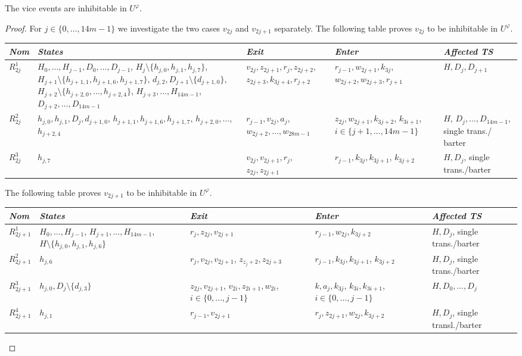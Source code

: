 \documentclass[english]{lipics_hacked}
\begin{document}
\begin{lemma}
\label{lemma:vice}
The vice events are inhibitable in $U^\varphi$.
\end{lemma}
%
\begin{proof}
For $j\in \{0,\dots, 14m-1\}$ we investigate the two cases $v_{2j}$ and $v_{2j+1}$ separately.
The following table proves $v_{2j}$ to be inhibitable in $U^\varphi$.
%
\begin{longtable}{p{0.5cm} p{3.9cm}   p{2.5cm}    p{2.7cm}      p{2cm}  }
\textit{Nom} &\textit{States} & \textit{Exit} & \textit{Enter} & \textit{Affected TS}  \\ \hline
$R_{2j}^1$ & $H_0,\dots,H_{j-1}, D_0,\dots,D_{j-1}$, $H_j\setminus\{h_{j,0},h_{j,1},h_{j,7}\}$, \newline$H_{j+1}\setminus\{h_{j+1,1},h_{j+1,6},h_{j+1,7}\}$, $d_{j,2}, D_{j+1}\setminus\{d_{j+1,0}\}$, $H_{j+2}\setminus\{h_{j+2,0},\ldots, h_{j+2,4}\}$, $H_{j+3},\dots,H_{14m-1}$, $D_{j+2},\dots,D_{14m-1}$ & $v_{2j},z_{2j+1},r_j,z_{2j+2}$, $z_{2j+3},k_{3j+4},r_{j+2}$ & $r_{j-1},w_{2j+1},k_{3j}$, $w_{2j+2},w_{2j+3},r_{j+1}$ & $H,D_{j},D_{j+1}$ \\
 $R_{2j}^2$ & $h_{j,0},h_{j,1}, D_j,d_{j+1,0}$, $h_{j+1,1},h_{j+1,6},h_{j+1,7}$, $h_{j+2,0},\ldots$, $h_{j+2,4}$& $r_{j-1},v_{2j},a_j$, $w_{2j+2},\ldots,w_{28m-1}$  & $z_{2j},w_{2j+1},k_{3j+2}$, $k_{3i+1}$, \newline $i\in\{j+1,\dots,14m-1\}$ & $H$, $D_j,\dots,D_{14m-1}$, single trans./ barter \\	
 $R_{2j}^3$ & $h_{j,7}$ & $v_{2j},v_{2j+1},r_j$, $z_{2j}, z_{2j+1}$  & $r_{j-1},k_{3j},k_{3j+1}$, $k_{3j+2}$ &  $H,D_j$, single trans./barter \\						\end{longtable}
%
The following table proves $v_{2j+1}$ to be inhibitable in $U^\varphi$.
%
\begin{longtable}{p{0.7cm} p{3cm}   p{2.5cm}    p{2.5cm}      p{2.7cm}  }
\textit{Nom} &\textit{States} & \textit{Exit} & \textit{Enter} & \textit{Affected TS}  \\ \hline
$R_{2j+1}^1$ & $H_0,\dots,H_{j-1}$, $H_{j+1},\dots,H_{14m-1}$, $H\setminus\{h_{j,0},h_{j,1},h_{j,6}\}$& $r_j,z_{2j},v_{2j+1}$ & $r_{j-1},w_{2j}, k_{3j+2}$& $H, D_j$, single trans./barter\\
 $R_{2j+1}^2$ & $h_{j,6}$& $r_j,v_{2j},v_{2j+1}$, $z_{z_j+2},z_{2j+3}$  & $r_{j-1},k_{3j},k_{3j+1}$, $k_{3j+2}$ &  $H,D_j$,  single trans./barter\\	
 $R_{2j+1}^3$& $h_{j,0}, D_j\setminus \{d_{j,3}\}$ &  $z_{2j},v_{2j+1}$, $v_{2i},z_{2i+1},w_{2i}$, $i\in \{0,\dots,j-1\}$ & $k,a_j,k_{3j}$, $k_{3i},k_{3i+1}$, $i\in \{0,\dots,j-1\}$  & $H,D_0,\dots,D_j$\\
 $R_{2j+1}^4$ & $h_{j,1}$ & $r_{j-1},v_{2j+1}$ & $ r_j,z_{2j+1},w_{2j},k_{3j+2}$ & $H,D_j$, single transl./barter\\							
\end{longtable}
\end{proof}
\end{document}
